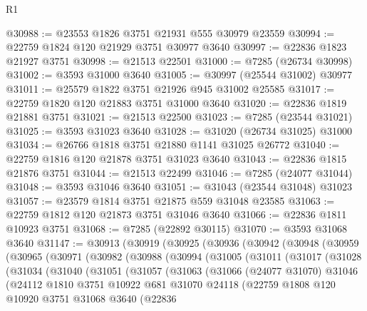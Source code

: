 \begin{lexlean}{R1}
\begin{coremodule}
@30988 := @23553 @1826 @3751 @21931 @555 @30979 @23559
@30994 := @22759 @1824 @120 @21929 @3751 @30977 @3640
@30997 := @22836 @1823 @21927 @3751
@30998 := @21513 @22501
@31000 := @7285 (@26734 @30998)
@31002 := @3593 @31000 @3640
@31005 := @30997 (@25544 @31002) @30977
@31011 := @25579 @1822 @3751 @21926 @945 @31002 @25585
@31017 := @22759 @1820 @120 @21883 @3751 @31000 @3640
@31020 := @22836 @1819 @21881 @3751
@31021 := @21513 @22500
@31023 := @7285 (@23544 @31021)
@31025 := @3593 @31023 @3640
@31028 := @31020 (@26734 @31025) @31000
@31034 := @26766 @1818 @3751 @21880 @1141 @31025 @26772
@31040 := @22759 @1816 @120 @21878 @3751 @31023 @3640
@31043 := @22836 @1815 @21876 @3751
@31044 := @21513 @22499
@31046 := @7285 (@24077 @31044)
@31048 := @3593 @31046 @3640
@31051 := @31043 (@23544 @31048) @31023
@31057 := @23579 @1814 @3751 @21875 @559 @31048 @23585
@31063 := @22759 @1812 @120 @21873 @3751 @31046 @3640
@31066 := @22836 @1811 @10923 @3751
@31068 := @7285 (@22892 @30115)
@31070 := @3593 @31068 @3640
@31147 := @30913
    (@30919
      (@30925
        (@30936
          (@30942
            (@30948
              (@30959
                (@30965
                  (@30971
                    (@30982
                      (@30988
                        (@30994
                          (@31005
                            (@31011
                              (@31017
                                (@31028
                                  (@31034
                                    (@31040
                                      (@31051
                                        (@31057
                                          (@31063
                                            (@31066
                                              (@24077 @31070)
                                              @31046
                                              (@24112
                                                @1810
                                                @3751
                                                @10922
                                                @681
                                                @31070
                                                @24118
                                                (@22759
                                                  @1808
                                                  @120
                                                  @10920
                                                  @3751
                                                  @31068
                                                  @3640
                                                  (@22836

\end{coremodule}
\end{lexlean}
